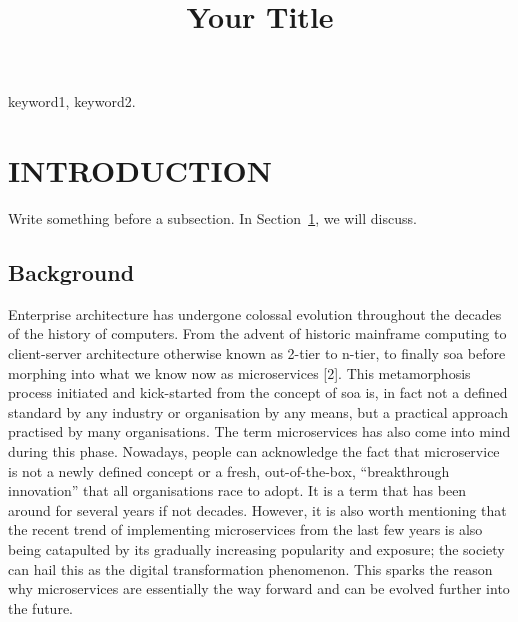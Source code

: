 \documentclass[conference, a4paper]{IEEEtran}
\begin{document}
\title{Your Title}

\author{

}

\maketitle


\begin{abstract}
\boldmath 
\lipsum[1]
\end{abstract}

\begin{IEEEkeywords}
keyword1, keyword2.
\end{IEEEkeywords}


\section{INTRODUCTION}
\label{sec:title}

Write something before a subsection. 
In Section~\ref{sec:title}, we will discuss. 

\subsection{Background}
\label{sec:sub:title}

Enterprise architecture has undergone colossal evolution throughout the decades of the history of computers. From the advent of historic mainframe computing to client-server architecture otherwise known as 2-tier to n-tier, to finally \gls{soa} before morphing into what we know now as microservices [2].
This metamorphosis process initiated and kick-started from the concept of \gls{soa} is, in fact not a defined standard 
by any industry or organisation by any means, but a practical approach practised by many organisations. 
The term microservices has also come into mind during this phase. 
Nowadays, people can acknowledge the fact that microservice is not a newly defined concept or a fresh, out-of-the-box, “breakthrough innovation” that all organisations race to adopt. 
It is a term that has been around for several years if not decades. However, it is also worth mentioning that the recent trend of implementing microservices from the last few years is also being catapulted by its gradually increasing popularity and exposure; 
the society can hail this as the digital transformation phenomenon. 
This sparks the reason why microservices are essentially the way forward and can be evolved further into the future. 
\end{document}
